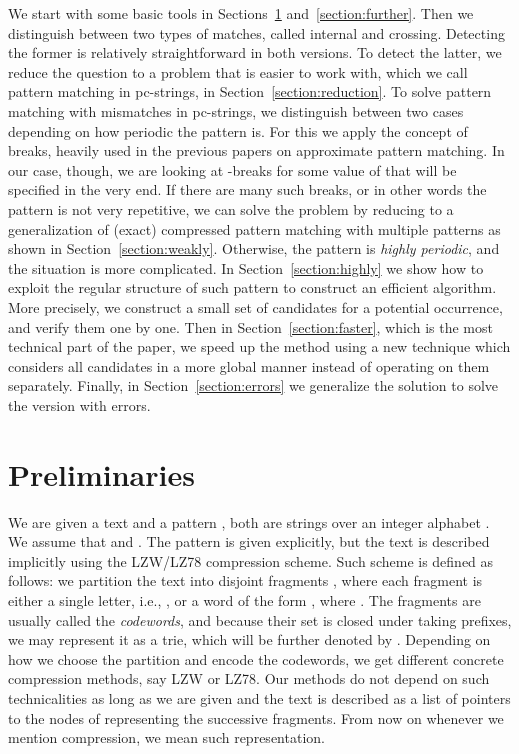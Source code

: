 \documentclass[runningheads]{llncs}
\begin{document}
We start with some basic tools in Sections~\ref{section:preliminaries} and~\ref{section:further}. Then we distinguish between two types of matches, called internal and crossing. Detecting the former is relatively straightforward in both versions. To detect the latter, we reduce the question to a problem that is easier to work with, which we call pattern matching in pc-strings, in Section~\ref{section:reduction}. To solve pattern matching with mismatches in pc-strings, we distinguish between
two cases depending on how periodic the pattern is. For this we apply the concept of breaks, heavily used in the previous papers on approximate pattern matching. In our case, though,
we are looking at -breaks for some value of  that will be specified in the very end. If there are many such breaks, or in other words the pattern is not very repetitive, we
can solve the problem by reducing to a generalization of (exact) compressed pattern matching with multiple patterns as shown in Section~\ref{section:weakly}. Otherwise, the pattern is {\it highly periodic},
and the situation is more complicated. In Section~\ref{section:highly} we show how to exploit the regular structure of such pattern to construct an efficient algorithm.
More precisely, we construct a small set of candidates for a potential occurrence, and verify them one by one. Then
in Section~\ref{section:faster}, which is the most technical part of the paper, we speed up the method using a new technique which considers all candidates in a more global manner instead of operating on them separately.
Finally, in Section~\ref{section:errors} we generalize the solution to solve the version with errors.

\section{Preliminaries}
\label{section:preliminaries}

We are given a text  and a pattern , both are strings over an integer alphabet . We assume that  and . The pattern is given explicitly, but the text is described implicitly using the LZW/LZ78 compression scheme. Such scheme is defined as follows: we partition the text into  disjoint fragments , where each fragment  is either a single letter, i.e., , or a word of the form , where . The fragments  are usually called the {\it codewords}, and because their set is closed under taking prefixes, we may represent it as a trie, which will be further denoted by . Depending on how we choose the partition and encode the codewords, we get different concrete compression methods, say LZW or LZ78. Our methods do not depend on such technicalities as long as we are given  and the text is described as a list of pointers to the nodes of  representing the successive fragments. From now on whenever we mention compression, we mean such representation.
\end{document}
